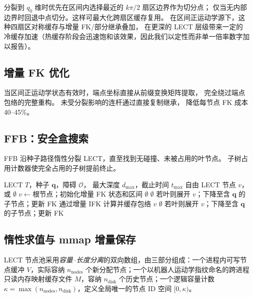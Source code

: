 \documentclass[journal]{IEEEtran}
\begin{document}
分裂到 $q_0$ 维时优先在区间内选择最近的 $k\pi/2$ 扇区边界作为切分点；
仅当无内部边界时回退中点切分。这样可最大化跨扇区缓存复用。
在区间正运动学源下，这种四扇区对称缓存与增量 FK/部分继承叠加，
在更深的 LECT 层级带来一定的冷缓存加速（热缓存阶段会迅速饱和该效果，因此我们以定性而非单一倍率数字加以报告）。

\subsection{增量 FK 优化}

当区间正运动学状态有效时，端点坐标直接从前缀变换矩阵提取，
完全绕过端点包络的完整重构。
未受分裂影响的连杆通过直接复制继承，
降低每节点 FK 成本 40--45\%。

\subsection{FFB：安全盒搜索}

FFB 沿种子路径惰性分裂 LECT，直至找到无碰撞、未被占用的叶节点。
子树占用计数器使完全占用的子树提前终止。

\begin{algorithm}[t]
\caption{安全盒搜索（FFB）}\label{alg:ffb}
\footnotesize
\begin{algorithmic}[1]
\REQUIRE LECT $T$，种子 $\bm{q}$，障碍 $\mathcal{O}$，
  最大深度 $d_{\max}$，截止时间 $t_{\max}$
\ENSURE 自由 LECT 节点 $v$，或 $\emptyset$
\STATE $v \leftarrow \text{根节点}$；初始化增量 FK 状态和区间
\WHILE{\TRUE}
    \RETURN $\emptyset$
  \ENDIF
      \RETURN $\emptyset$
    \ENDIF
    \STATE 若叶则展开 $v$；下降至含 $\bm{q}$ 的子节点；更新 FK
  \ELSE
      \STATE 通过增量 IFK 计算并缓存包络
    \ENDIF
      \RETURN $v$ \hfill{}
    \ELSE
        \RETURN $\emptyset$
      \ENDIF
      \STATE 若叶则展开 $v$；下降至含 $\bm{q}$ 的子节点；更新 FK
    \ENDIF
  \ENDIF
\ENDWHILE
\end{algorithmic}
\end{algorithm}

\subsection{惰性求值与 mmap 增量保存}\label{sec:lect_lazy}

LECT 节点池采用\emph{容量--长度分离}的双向数组，由三部分组成：一个进程内可写节点缓冲 $V$，实际容纳 $n_\text{nodes}$ 个新分配节点；一个以机器人运动学指纹命名的跨进程只读内存映射缓存文件 $M$，容纳 $n_\text{disk}$ 个历史节点；一个逻辑容量计数 $\kappa = \max(n_\text{nodes},n_\text{disk})$，定义全局唯一的节点 ID 空间 $[0,\kappa)$。
\end{document}
